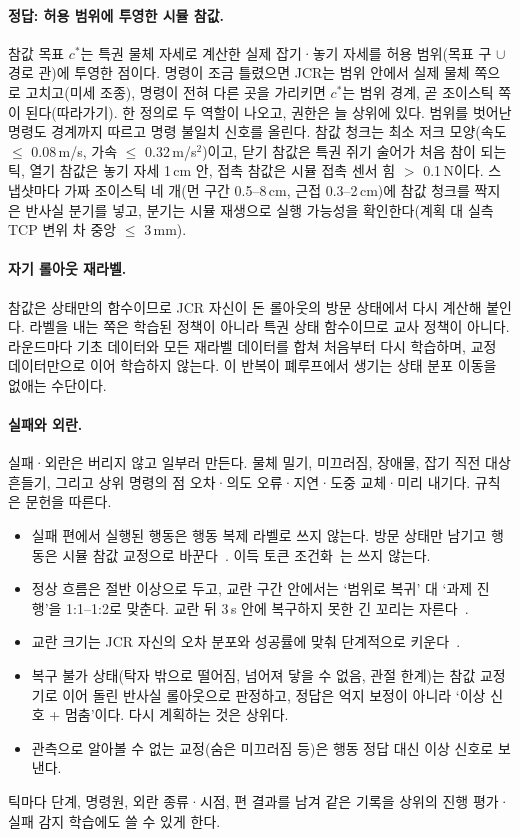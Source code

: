 \paragraph{정답: 허용 범위에 투영한 시뮬 참값.} 참값 목표 $c^\ast$는 특권 물체 자세로 계산한 실제 잡기·놓기 자세를 허용 범위(목표 구 $\cup$ 경로 관)에 투영한 점이다. 명령이 조금 틀렸으면 JCR는 범위 안에서 실제 물체 쪽으로 고치고(미세 조종), 명령이 전혀 다른 곳을 가리키면 $c^\ast$는 범위 경계, 곧 조이스틱 쪽이 된다(따라가기). 한 정의로 두 역할이 나오고, 권한은 늘 상위에 있다. 범위를 벗어난 명령도 경계까지 따르고 명령 불일치 신호를 올린다. 참값 청크는 최소 저크 모양(속도 $\le$ 0.08\,m/s, 가속 $\le$ 0.32\,m/s$^2$)이고, 닫기 참값은 특권 쥐기 술어가 처음 참이 되는 틱, 열기 참값은 놓기 자세 1\,cm 안, 접촉 참값은 시뮬 접촉 센서 힘 $>$ 0.1\,N이다. 스냅샷마다 가짜 조이스틱 네 개(먼 구간 0.5--8\,cm, 근접 0.3--2\,cm)에 참값 청크를 짝지은 반사실 분기를 넣고, 분기는 시뮬 재생으로 실행 가능성을 확인한다(계획 대 실측 TCP 변위 차 중앙 $\le$ 3\,mm).

\paragraph{자기 롤아웃 재라벨.} 참값은 상태만의 함수이므로 JCR 자신이 돈 롤아웃의 방문 상태에서 다시 계산해 붙인다. 라벨을 내는 쪽은 학습된 정책이 아니라 특권 상태 함수이므로 교사 정책이 아니다. 라운드마다 기초 데이터와 모든 재라벨 데이터를 합쳐 처음부터 다시 학습하며, 교정 데이터만으로 이어 학습하지 않는다. 이 반복이 폐루프에서 생기는 상태 분포 이동을 없애는 수단이다.

\paragraph{실패와 외란.} 실패·외란은 버리지 않고 일부러 만든다. 물체 밀기, 미끄러짐, 장애물, 잡기 직전 대상 흔들기, 그리고 상위 명령의 점 오차·의도 오류·지연·도중 교체·미리 내기다. 규칙은 문헌을 따른다.
\begin{itemize}
  \item 실패 편에서 실행된 행동은 행동 복제 라벨로 쓰지 않는다. 방문 상태만 남기고 행동은 시뮬 참값 교정으로 바꾼다~\cite{crdagger2025,rac2025}. 이득 토큰 조건화~\cite{recap2025}는 쓰지 않는다.
  \item 정상 흐름은 절반 이상으로 두고, 교란 구간 안에서는 `범위로 복귀' 대 `과제 진행'을 1:1--1:2로 맞춘다. 교란 뒤 3\,s 안에 복구하지 못한 긴 꼬리는 자른다~\cite{rac2025}.
  \item 교란 크기는 JCR 자신의 오차 분포와 성공률에 맞춰 단계적으로 키운다~\cite{laskey2017dart}.
  \item 복구 불가 상태(탁자 밖으로 떨어짐, 넘어져 닿을 수 없음, 관절 한계)는 참값 교정기로 이어 돌린 반사실 롤아웃으로 판정하고, 정답은 억지 보정이 아니라 `이상 신호 + 멈춤'이다. 다시 계획하는 것은 상위다.
  \item 관측으로 알아볼 수 없는 교정(숨은 미끄러짐 등)은 행동 정답 대신 이상 신호로 보낸다.
\end{itemize}
틱마다 단계, 명령원, 외란 종류·시점, 편 결과를 남겨 같은 기록을 상위의 진행 평가·실패 감지 학습에도 쓸 수 있게 한다.

